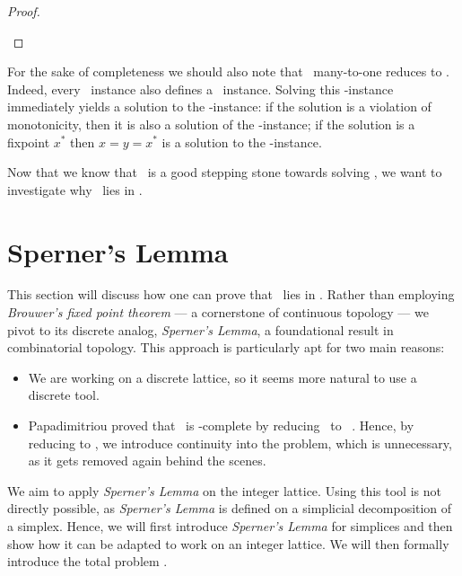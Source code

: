 \begin{proof}
\begin{case}{3}
	\end{case}
\end{proof}

For the sake of completeness we should also note that \Tarskistar\ many-to-one reduces to \Tarski. Indeed, every \Tarskistar\ instance also defines a \Tarski\ instance. Solving this \Tarski-instance immediately yields a solution to the \Tarskistar-instance: if the solution is a violation of monotonicity, then it is also a solution of the \Tarski-instance; if the solution is a fixpoint $x^*$ then $x=y=x^*$ is a solution to the \Tarskistar-instance.

Now that we know that \Tarskistar\ is a good stepping stone towards solving \Tarski, we want to investigate why \Tarskistar\ lies in \PPAD\@.

\section{Sperner's Lemma}

This section will discuss how one can prove that \Tarskistar\ lies in \PPAD\@. Rather than employing \textit{Brouwer's fixed point theorem} --- a cornerstone of continuous topology --- we pivot to its discrete analog, \textit{Sperner's Lemma}, a foundational result in combinatorial topology. This approach is particularly apt for two main reasons:
\begin{itemize}
	\item We are working on a discrete lattice, so it seems more natural to use a discrete tool.
	\item Papadimitriou proved that \Brouwer\ is \PPAD-complete by reducing \Brouwer\ to \Sperner\ . Hence, by reducing to \Brouwer, we introduce continuity into the problem, which is unnecessary, as it gets removed again behind the scenes.
\end{itemize}

We aim to apply \textit{Sperner's Lemma} on the integer lattice. Using this tool is not directly possible, as \textit{Sperner's Lemma} is defined on a simplicial decomposition of a simplex. Hence, we will first introduce \textit{Sperner's Lemma} for simplices and then show how it can be adapted to work on an integer lattice. We will then formally introduce the total problem \Sperner.

